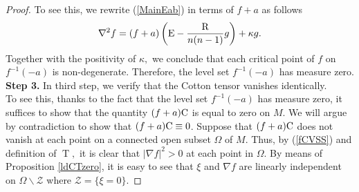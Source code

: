 \documentclass[10pt,leqno,oneside]{amsart}
\begin{document}
{\begin{proof}
        To see this, we rewrite (\ref{MainEab}) in terms of $f+a$ as follows
           \[\nabla^2f=(f+a)\left({\rm E}-\frac{{\rm R}}{n(n-1)}g\right)+\kappa g.\]
        Together with the positivity of $\kappa,$ we conclude that each critical point of $f$ on $f^{-1}(-a)$ is non-degenerate. Therefore, the level set $f^{-1}(-a)$ has measure zero.\\
    {\bf Step 3.} In third step, we verify that the Cotton tensor vanishes identically. \\
        To see this, thanks to the fact that the level set $f^{-1}(-a)$ has measure zero, it suffices to show that the quantity $(f+a){\rm C}$ is equal to zero on $M.$ We will argue by contradiction to show that $(f+a){\rm C}\equiv0$. Suppose that $(f+a){\rm C}$ does not vanish at each point on a connected open subset $\Omega$ of $M.$ Thus, by (\ref{fCVSS}) and definition of $\operatorname{T},$ it is clear that $|\nabla f|^2>0$ at each point in $\Omega.$ By means of Proposition \ref{ldCTzero}, it is easy to see that $\xi$ and $\nabla f$ are linearly independent on $\Omega\backslash \mathcal{Z}$ where $\mathcal{Z}=\{\xi=0\}.$


\end{proof}}
\end{document}
